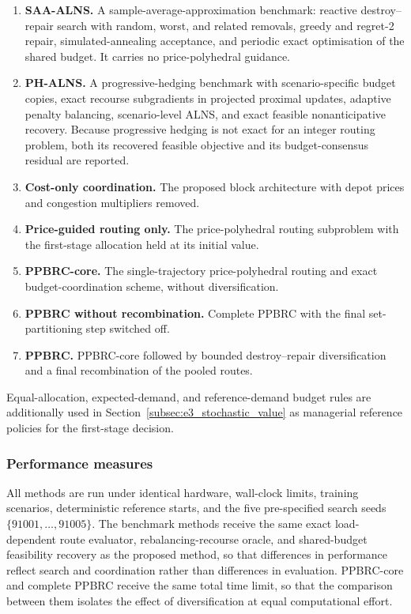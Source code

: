 \documentclass[authoryear,final,3p,times]{elsarticle}
\theoremstyle{definition}
\theoremstyle{plain}
\begin{document}
\begin{enumerate}
\item \textbf{SAA-ALNS.} A sample-average-approximation benchmark: reactive destroy--repair search with random, worst, and related removals, greedy and regret-2 repair, simulated-annealing acceptance, and periodic exact optimisation of the shared budget.  It carries no price-polyhedral guidance.
\item \textbf{PH-ALNS.} A progressive-hedging benchmark with scenario-specific budget copies, exact recourse subgradients in projected proximal updates, adaptive penalty balancing, scenario-level ALNS, and exact feasible nonanticipative recovery.  Because progressive hedging is not exact for an integer routing problem, both its recovered feasible objective and its budget-consensus residual are reported.
\item \textbf{Cost-only coordination.} The proposed block architecture with depot prices and congestion multipliers removed.
\item \textbf{Price-guided routing only.} The price-polyhedral routing subproblem with the first-stage allocation held at its initial value.
\item \textbf{PPBRC-core.} The single-trajectory price-polyhedral routing and exact budget-coordination scheme, without diversification.
\item \textbf{PPBRC without recombination.} Complete PPBRC with the final set-partitioning step switched off.
\item \textbf{PPBRC.} PPBRC-core followed by bounded destroy--repair diversification and a final recombination of the pooled routes.
\end{enumerate}

Equal-allocation, expected-demand, and reference-demand budget rules are
additionally used in Section~\ref{subsec:e3_stochastic_value} as managerial
reference policies for the first-stage decision.

\subsubsection{Performance measures}
\label{subsubsec:performance_measures}

All methods are run under identical hardware, wall-clock limits, training
scenarios, deterministic reference starts, and the five pre-specified search
seeds $\{91001,\dots,91005\}$.  The benchmark methods receive the same exact
load-dependent route evaluator, rebalancing-recourse oracle, and shared-budget
feasibility recovery as the proposed method, so that differences in
performance reflect search and coordination rather than differences in
evaluation.  PPBRC-core and complete PPBRC receive the same total time limit, so that the
comparison between them isolates the effect of diversification at equal
computational effort.
\end{document}
